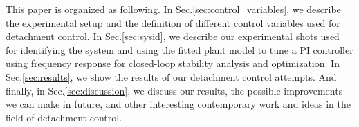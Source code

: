 This paper is organized as following.
In Sec.\ref{sec:control_variables}, we describe the experimental setup and the definition of different control variables used for detachment control.
In Sec.\ref{sec:sysid}, we describe our experimental shots used for identifying the system and using the fitted plant model to tune a PI controller using frequency response for closed-loop stability analysis and optimization.
In Sec.\ref{sec:results}, we show the results of our detachment control attempts.
And finally, in Sec.\ref{sec:discussion}, we discuss our results, the possible improvements we can make in future, and other interesting contemporary work and ideas in the field of detachment control.